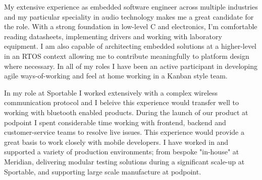 \documentclass[11pt, a4paper]{awesome-cv}
\begin{document}
\begin{cvletter}

My extensive experience as embedded software engineer across multiple industries and my particular speciality in audio technology makes me a great candidate for the role. 
With a strong foundation in low-level C and electronics, I’m comfortable reading datasheets, implementing drivers and working with laboratory equipment. I am also capable of architecting embedded solutions at a higher-level in an RTOS context allowing me to contribute meaningfully to platform design where necessary.
In all of my roles I have been an active participant in developing agile ways-of-working and feel at home working in a Kanban style team.

In my role at Sportable I worked extensively with a complex wireless communication protocol and I beleive this experience would transfer well to working with bluetooth enabled products.
During the launch of our product at podpoint I spent considerable time working with frontend, backend and customer-service teams to resolve live issues. This experience would provide a great basis to work closely with mobile developers.
I have worked in and supported a variety of production environments; from bespoke "in-house" at Meridian, delivering modular testing solutions during a significant scale-up at Sportable, and supporting large scale manufacture at podpoint. 

\end{cvletter}


\makeletterclosing
\end{document}

